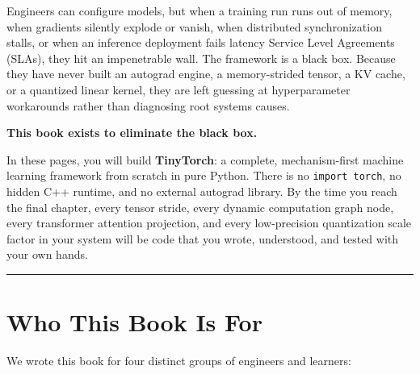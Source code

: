 \documentclass[
  letterpaper,
]{scrbook}
\begin{document}
Engineers can configure models, but when a training run runs out of
memory, when gradients silently explode or vanish, when distributed
synchronization stalls, or when an inference deployment fails latency
Service Level Agreements (SLAs), they hit an impenetrable wall. The
framework is a black box. Because they have never built an autograd
engine, a memory-strided tensor, a KV cache, or a quantized linear
kernel, they are left guessing at hyperparameter workarounds rather than
diagnosing root systems causes.

\textbf{This book exists to eliminate the black box.}

In these pages, you will build \textbf{TinyTorch}: a complete,
mechanism-first machine learning framework from scratch in pure Python.
There is no \texttt{import\ torch}, no hidden C++ runtime, and no
external autograd library. By the time you reach the final chapter,
every tensor stride, every dynamic computation graph node, every
transformer attention projection, and every low-precision quantization
scale factor in your system will be code that you wrote, understood, and
tested with your own hands.

\begin{center}\rule{0.5\linewidth}{0.5pt}\end{center}

\section*{Who This Book Is For}\label{who-this-book-is-for}


We wrote this book for four distinct groups of engineers and learners:
\end{document}
